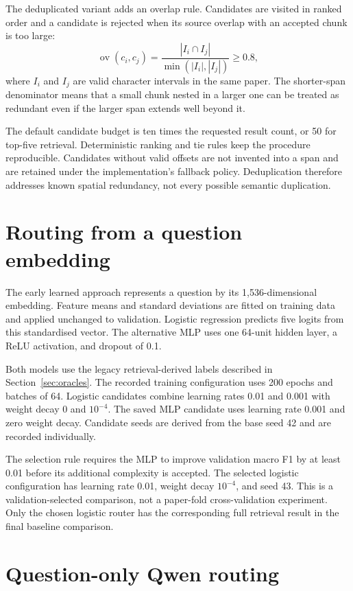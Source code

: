 The deduplicated variant adds an overlap rule. Candidates are visited
in ranked order and a candidate is rejected when its source overlap
with an accepted chunk is too large:
\begin{equation}
\operatorname{ov}(c_i,c_j)=
\frac{|I_i\cap I_j|}{\min(|I_i|,|I_j|)}\geq 0.8,
\label{eq:overlap}
\end{equation}
where $I_i$ and $I_j$ are valid character intervals in the same paper.
The shorter-span denominator means that a small chunk nested in a
larger one can be treated as redundant even if the larger span extends
well beyond it.

The default candidate budget is ten times the requested result count,
or 50 for top-five retrieval. Deterministic ranking and tie rules keep
the procedure reproducible. Candidates without valid offsets are not
invented into a span and are retained under the implementation's
fallback policy. Deduplication therefore addresses known spatial
redundancy, not every possible semantic duplication.

\section{Routing from a question embedding}
The early learned approach represents a question by its 1,536-dimensional
embedding. Feature means and standard deviations are fitted on training
data and applied unchanged to validation. Logistic regression predicts
five logits from this standardised vector. The alternative MLP uses
one 64-unit hidden layer, a ReLU activation, and dropout of 0.1.

Both models use the legacy retrieval-derived labels described in
Section~\ref{sec:oracles}. The recorded training configuration uses
200 epochs and batches of 64. Logistic candidates combine learning
rates 0.01 and 0.001 with weight decay 0 and $10^{-4}$. The saved MLP
candidate uses learning rate 0.001 and zero weight decay. Candidate
seeds are derived from the base seed 42 and are recorded individually.

The selection rule requires the MLP to improve validation macro F1 by
at least 0.01 before its additional complexity is accepted. The selected
logistic configuration has learning rate 0.01, weight decay $10^{-4}$,
and seed 43. This is a validation-selected comparison, not a paper-fold
cross-validation experiment. Only the chosen logistic router has the
corresponding full retrieval result in the final baseline comparison.

\section{Question-only Qwen routing}
